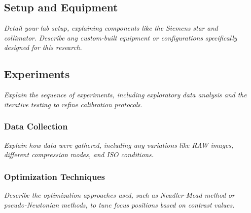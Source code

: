 \documentclass[main]{subfiles}
\begin{document}
\subsection{Setup and Equipment}
\textit{
  Detail your lab setup, explaining components like the Siemens star and collimator. Describe any custom-built equipment or configurations specifically designed for this research.
}

\subsection{Experiments}
\textit{
  Explain the sequence of experiments, including exploratory data analysis and the iterative testing to refine calibration protocols.
  }

\subsubsection{Data Collection}
  \textit{
    Explain how data were gathered, including any variations like RAW images, different compression modes, and ISO conditions.
  }

\subsubsection{Optimization Techniques}
\textit{
  Describe the optimization approaches used, such as Neadler-Mead method or pseudo-Newtonian methods, to tune focus positions based on contrast values.
}
\end{document}
